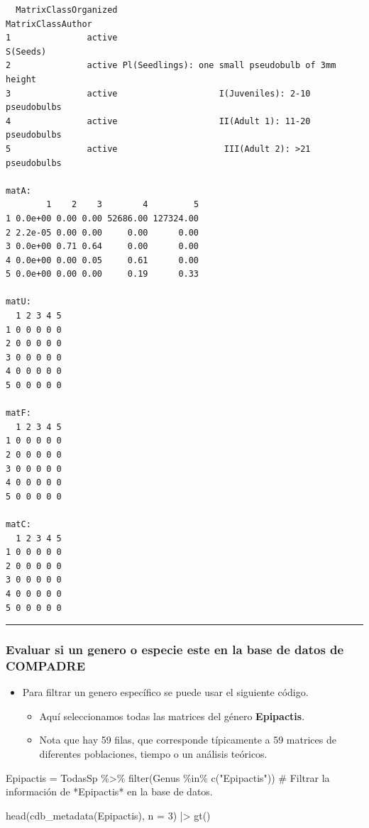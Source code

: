 \documentclass[
  12pt,
  letterpaper,
]{book}
\newenvironment{Shaded}{\begin{snugshade}}{\end{snugshade}}
\newcommand{\AttributeTok}[1]{\textcolor[rgb]{0.40,0.45,0.13}{#1}}
\newcommand{\CommentTok}[1]{\textcolor[rgb]{0.37,0.37,0.37}{#1}}
\newcommand{\DecValTok}[1]{\textcolor[rgb]{0.68,0.00,0.00}{#1}}
\newcommand{\FunctionTok}[1]{\textcolor[rgb]{0.28,0.35,0.67}{#1}}
\newcommand{\NormalTok}[1]{\textcolor[rgb]{0.00,0.23,0.31}{#1}}
\newcommand{\OtherTok}[1]{\textcolor[rgb]{0.00,0.23,0.31}{#1}}
\newcommand{\SpecialCharTok}[1]{\textcolor[rgb]{0.37,0.37,0.37}{#1}}
\newcommand{\StringTok}[1]{\textcolor[rgb]{0.13,0.47,0.30}{#1}}
\providecommand{\tightlist}{%
  \setlength{\itemsep}{0pt}\setlength{\parskip}{0pt}}\usepackage{longtable,booktabs,array}
\begin{document}
\begin{verbatim}
  MatrixClassOrganized                                 MatrixClassAuthor
1               active                                          S(Seeds)
2               active Pl(Seedlings): one small pseudobulb of 3mm height
3               active                    I(Juveniles): 2-10 pseudobulbs
4               active                    II(Adult 1): 11-20 pseudobulbs
5               active                     III(Adult 2): >21 pseudobulbs

matA:
        1    2    3        4         5
1 0.0e+00 0.00 0.00 52686.00 127324.00
2 2.2e-05 0.00 0.00     0.00      0.00
3 0.0e+00 0.71 0.64     0.00      0.00
4 0.0e+00 0.00 0.05     0.61      0.00
5 0.0e+00 0.00 0.00     0.19      0.33

matU:
  1 2 3 4 5
1 0 0 0 0 0
2 0 0 0 0 0
3 0 0 0 0 0
4 0 0 0 0 0
5 0 0 0 0 0

matF:
  1 2 3 4 5
1 0 0 0 0 0
2 0 0 0 0 0
3 0 0 0 0 0
4 0 0 0 0 0
5 0 0 0 0 0

matC:
  1 2 3 4 5
1 0 0 0 0 0
2 0 0 0 0 0
3 0 0 0 0 0
4 0 0 0 0 0
5 0 0 0 0 0
\end{verbatim}

\begin{center}\rule{0.5\linewidth}{0.5pt}\end{center}

\subsubsection{Evaluar si un genero o especie este en la base de datos
de
COMPADRE}\label{evaluar-si-un-genero-o-especie-este-en-la-base-de-datos-de-compadre}

\begin{itemize}
\tightlist
\item
  Para filtrar un genero específico se puede usar el siguiente código.

  \begin{itemize}
  \tightlist
  \item
    Aquí seleccionamos todas las matrices del género \textbf{Epipactis}.
  \item
    Nota que hay 59 filas, que corresponde típicamente a 59 matrices de
    diferentes poblaciones, tiempo o un análisis teóricos.
  \end{itemize}
\end{itemize}

\begin{Shaded}
\begin{Highlighting}[]
\NormalTok{Epipactis }\OtherTok{=}\NormalTok{ TodasSp }\SpecialCharTok{\%\textgreater{}\%}
  \FunctionTok{filter}\NormalTok{(Genus }\SpecialCharTok{\%in\%} \FunctionTok{c}\NormalTok{(}\StringTok{"Epipactis"}\NormalTok{)) }\CommentTok{\# Filtrar la información de *Epipactis* en la base de datos.}

\FunctionTok{head}\NormalTok{(}\FunctionTok{cdb\_metadata}\NormalTok{(Epipactis), }\AttributeTok{n =} \DecValTok{3}\NormalTok{) }\SpecialCharTok{|\textgreater{}} 
  \FunctionTok{gt}\NormalTok{()}
\end{Highlighting}
\end{Shaded}
\end{document}
